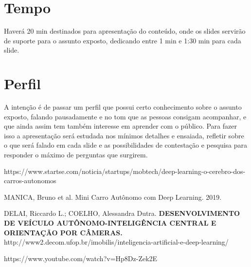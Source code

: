 \documentclass[12pt,a4paper]{article}
\begin{document}
    

    \section{Tempo}
    \par Haverá 20 min destinados para apresentação do conteúdo, onde os slides servirão de suporte para o assunto exposto, dedicando entre 1 min e 1:30 min para cada slide.  
    
    \section{Perfil}
    \par A intenção é de passar um perfil que possui certo conhecimento sobre o assunto exposto, falando pausadamente e no tom que as pessoas consigam acompanhar, e que ainda assim tem também interesse em aprender com o público. Para fazer isso a apresentação será estudada nos mínimos detalhes e ensaiada, refletir sobre o que será falado em cada slide e as possibilidades de contestação e pesquisa para responder o máximo de perguntas que surgirem.


     
    \begin{thebibliography}{BIBLIOGRAFIA}

         https://www.startse.com/noticia/startups/mobtech/deep-learning-o-cerebro-dos-carros-autonomos
        
         MANICA, Bruno et al. Mini Carro Autônomo com Deep Learning. 2019.

         DELAI, Riccardo L.; COELHO, Alessandra Dutra. \textbf{DESENVOLVIMENTO DE VEÍCULO AUTÔNOMO-INTELIGÊNCIA CENTRAL E ORIENTAÇÃO POR CÂMERAS.}
         http://www2.decom.ufop.br/imobilis/inteligencia-artificial-e-deep-learning/

         https://www.youtube.com/watch?v=Hp8Dz-Zek2E
    
    \end{thebibliography}






\end{document}
